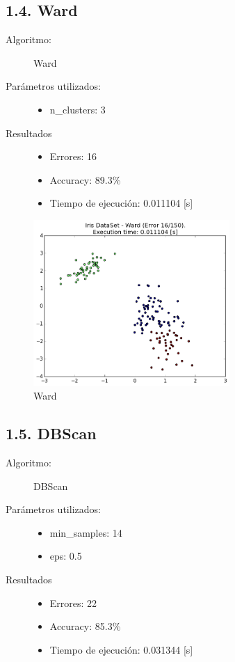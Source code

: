 \documentclass{article}
\begin{document}
\subsection*{1.4. \; Ward}
\begin{description}
  \item[Algoritmo:] Ward
  \item[Parámetros utilizados:] \hfill
    \begin{itemize}
      \item n\_clusters: 3
    \end{itemize}
  \item[Resultados]\hfill
    \begin{itemize}
      \item Errores: 16
      \item Accuracy:  89.3\%
      \item Tiempo de ejecución: 0.011104 [s]
    \end{itemize}
\end{description}

\begin{figure}[H]
  \centering
  \includegraphics[width=0.666\textwidth]{img/Ward.png}
  \caption{Ward}
\end{figure}

\newpage




\subsection*{1.5. \; DBScan}

\begin{description}
  \item[Algoritmo:] DBScan
  \item[Parámetros utilizados:] \hfill
    \begin{itemize}
      \item min\_samples: 14
      \item eps: 0.5
    \end{itemize}
  \item[Resultados]\hfill
    \begin{itemize}
      \item Errores: 22
      \item Accuracy:  85.3\%
      \item Tiempo de ejecución: 0.031344 [s]
    \end{itemize}
\end{description}
\end{document}
